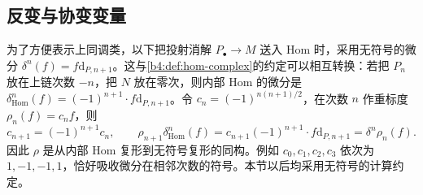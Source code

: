 \subsection{反变与协变变量}
\label{b4:subsec:0802:02}

为了方便表示上同调类，以下把投射消解 \(P_\bullet\to M\) 送入 Hom 时，采用无符号的微分 \(\delta^n(f)=f\mathrm{d}_{P,n+1}\)。这与\cref{b4:def:hom-complex}的约定可以相互转换：若把 \(P_n\) 放在上链次数 \(-n\)，把 \(N\) 放在零次，则内部 Hom 的微分是 \(\delta_{\mathrm{Hom}}^n(f)=(-1)^{n+1}\cdot f\mathrm{d}_{P,n+1}\)。令 \(c_n=(-1)^{n(n+1)/2}\)，在次数 \(n\) 作重标度 \(\rho_n(f)=c_nf\)，则
\[
	c_{n+1}=(-1)^{n+1}c_n, \qquad \rho_{n+1}\delta_{\mathrm{Hom}}^n(f) =c_{n+1}(-1)^{n+1}\cdot f\mathrm{d}_{P,n+1} =\delta^n\rho_n(f).
\]
因此 \(\rho\) 是从内部 Hom 复形到无符号复形的同构。例如 \(c_0,c_1,c_2,c_3\) 依次为 \(1,-1,-1,1\)，恰好吸收微分在相邻次数的符号。本节以后均采用无符号的计算约定。

